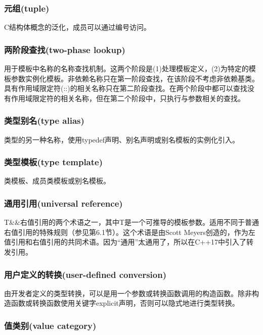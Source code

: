 \subsubsection{元组(tuple)}

C结构体概念的泛化，成员可以通过编号访问。

\subsubsection{两阶段查找(two-phase lookup)}

用于模板中名称的名称查找机制。这两个阶段是(1)处理模板定义，(2)为特定的模板参数实例化模板。非依赖名称只在第一阶段查找，在该阶段不考虑非依赖基类。具有作用域限定符(::)的相关名称只在第二阶段查找。在两个阶段中都可以查找没有作用域限定符的相关名称，但在第二个阶段中，只执行与参数相关的查找。

\subsubsection{类型别名(type alias)}

类型的另一种名称，使用typedef声明、别名声明或别名模板的实例化引入。

\subsubsection{类型模板(type template)}

类模板、成员类模板或别名模板。

\subsubsection{通用引用(universal reference)}

T\&\&右值引用的两个术语之一，其中T是一个可推导的模板参数。适用不同于普通右值引用的特殊规则（参见第6.1节）。这个术语是由Scott Meyers创造的，作为左值引用和右值引用的共同术语。因为“通用”太通用了，所以在C++17中引入了转发引用。

\subsubsection{用户定义的转换(user-defined conversion)}

由开发者定义的类型转换，可以是用一个参数或转换函数调用的构造函数。除非构造函数或转换函数使用关键字explicit声明，否则可以隐式地进行类型转换。

\subsubsection{值类别(value category)}

